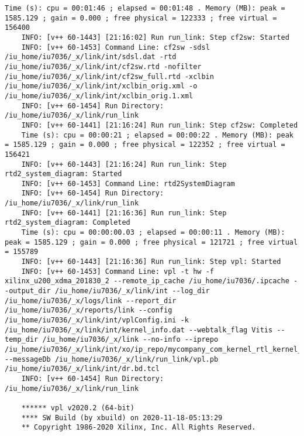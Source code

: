 \begin{lstlisting}[caption=Содержимое файла v++\_vinc.log для измененного проекта, label={log2}]
	Time (s): cpu = 00:01:46 ; elapsed = 00:01:48 . Memory (MB): peak = 1585.129 ; gain = 0.000 ; free physical = 122333 ; free virtual = 156400
	INFO: [v++ 60-1443] [21:16:02] Run run_link: Step cf2sw: Started
	INFO: [v++ 60-1453] Command Line: cf2sw -sdsl /iu_home/iu7036/_x/link/int/sdsl.dat -rtd /iu_home/iu7036/_x/link/int/cf2sw.rtd -nofilter /iu_home/iu7036/_x/link/int/cf2sw_full.rtd -xclbin /iu_home/iu7036/_x/link/int/xclbin_orig.xml -o /iu_home/iu7036/_x/link/int/xclbin_orig.1.xml
	INFO: [v++ 60-1454] Run Directory: /iu_home/iu7036/_x/link/run_link
	INFO: [v++ 60-1441] [21:16:24] Run run_link: Step cf2sw: Completed
	Time (s): cpu = 00:00:21 ; elapsed = 00:00:22 . Memory (MB): peak = 1585.129 ; gain = 0.000 ; free physical = 122352 ; free virtual = 156421
	INFO: [v++ 60-1443] [21:16:24] Run run_link: Step rtd2_system_diagram: Started
	INFO: [v++ 60-1453] Command Line: rtd2SystemDiagram
	INFO: [v++ 60-1454] Run Directory: /iu_home/iu7036/_x/link/run_link
	INFO: [v++ 60-1441] [21:16:36] Run run_link: Step rtd2_system_diagram: Completed
	Time (s): cpu = 00:00:00.03 ; elapsed = 00:00:11 . Memory (MB): peak = 1585.129 ; gain = 0.000 ; free physical = 121721 ; free virtual = 155789
	INFO: [v++ 60-1443] [21:16:36] Run run_link: Step vpl: Started
	INFO: [v++ 60-1453] Command Line: vpl -t hw -f xilinx_u200_xdma_201830_2 --remote_ip_cache /iu_home/iu7036/.ipcache --output_dir /iu_home/iu7036/_x/link/int --log_dir /iu_home/iu7036/_x/logs/link --report_dir /iu_home/iu7036/_x/reports/link --config /iu_home/iu7036/_x/link/int/vplConfig.ini -k /iu_home/iu7036/_x/link/int/kernel_info.dat --webtalk_flag Vitis --temp_dir /iu_home/iu7036/_x/link --no-info --iprepo /iu_home/iu7036/_x/link/int/xo/ip_repo/mycompany_com_kernel_rtl_kernel_wizard_2_1_0 --messageDb /iu_home/iu7036/_x/link/run_link/vpl.pb /iu_home/iu7036/_x/link/int/dr.bd.tcl
	INFO: [v++ 60-1454] Run Directory: /iu_home/iu7036/_x/link/run_link
	
	****** vpl v2020.2 (64-bit)
	**** SW Build (by xbuild) on 2020-11-18-05:13:29
	** Copyright 1986-2020 Xilinx, Inc. All Rights Reserved.
	

\end{lstlisting}
